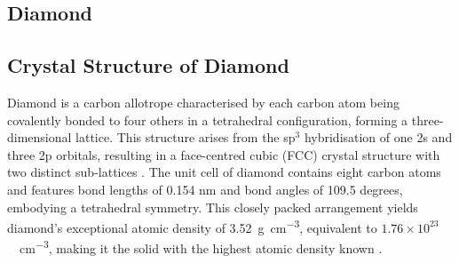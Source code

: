 \begin{refsection}
\section{Diamond}
\subsection{Crystal Structure of Diamond}
Diamond is a carbon allotrope characterised by each carbon atom being covalently bonded to four others in a tetrahedral configuration, forming a three-dimensional lattice. This structure arises from the sp$^{3}$ hybridisation of one 2s and three 2p orbitals, resulting in a face-centred cubic (FCC) crystal structure with two distinct sub-lattices \cite{Nor2010}. The unit cell of diamond contains eight carbon atoms and features bond lengths of 0.154 nm and bond angles of 109.5 degrees, embodying a tetrahedral symmetry. This closely packed arrangement yields diamond's exceptional atomic density of 3.52~\si{\gram\per\centi\metre\cubed}, equivalent to $1.76 \times 10^{23}$~\si{\atoms\per\centi\metre\cubed}, making it the solid with the highest atomic density known \cite{Narayan2011}. 

\end{refsection}
